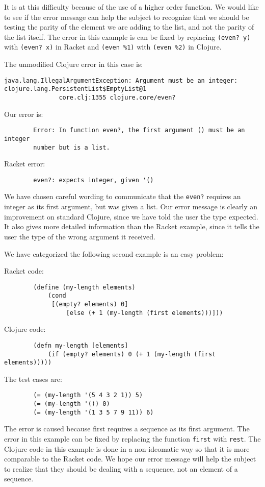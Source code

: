 \documentclass[12pt]{article}
\begin{document}
	It is at this difficulty because of the use of a higher order function.
We would like to see if the error message can help the subject to recognize that we should be testing the parity of the element we are adding to the list, and not the parity of the list itself.
	The error in this example is can be fixed by replacing \texttt{(even? y)} with   \texttt{(even? x)} in Racket and \texttt{(even \%1)} with \texttt{(even \%2)} in Clojure. 
	
	The unmodified Clojure error in this case is:
\begin{verbatim}
java.lang.IllegalArgumentException: Argument must be an integer: 
clojure.lang.PersistentList$EmptyList@1
               core.clj:1355 clojure.core/even?	
\end{verbatim}

	Our error is:
\begin{verbatim}
		Error: In function even?, the first argument () must be an integer 
		number but is a list.
\end{verbatim}



	Racket error:
\begin{verbatim}
		even?: expects integer, given '()
\end{verbatim}

	We have chosen careful wording to communicate that the \texttt{even?} requires an integer as its first argument, but was given a list. 
	Our error message is clearly an improvement on standard Clojure, since we have told the user the type expected. 
	It also gives more detailed information than the Racket example, since it tells the user the type of the wrong argument it received.
	
	We have categorized the following second example is an easy problem: 

	Racket code:
\begin{verbatim}
		(define (my-length elements)
  			(cond
 			 [(empty? elements) 0]
			 	 [else (+ 1 (my-length (first elements)))]))
\end{verbatim}
	Clojure code:
\begin{verbatim}
		(defn my-length [elements]
 			(if (empty? elements) 0 (+ 1 (my-length (first elements)))))
\end{verbatim}
	The test cases are:
\begin{verbatim}
		(= (my-length '(5 4 3 2 1)) 5)
		(= (my-length '()) 0)
		(= (my-length '(1 3 5 7 9 11)) 6)
\end{verbatim}
	The error is caused because first requires a sequence as its first argument. 
	The error in this example can be fixed by replacing the function \texttt{first} with \texttt{rest}. 
	The Clojure code in this example is done in a non-ideomatic way so that it is more comparable to the Racket code.
	We hope our error message will help the subject to realize that they should be dealing with a sequence, not an element of a sequence. 
\end{document}
